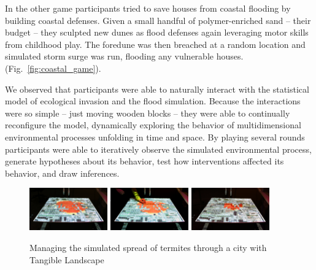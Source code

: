\documentclass[prodmode,acmtochi]{acmsmall} %
\begin{document}
In the other game participants tried to save houses 
from coastal flooding by building coastal defenses. 
Given a small handful of polymer-enriched sand 
-- their budget -- 
they sculpted new dunes as flood defenses
again leveraging motor skills from childhood play.
The foredune was then breached at a random location 
and simulated storm surge was run, flooding any vulnerable houses. 
(Fig.~\ref{fig:coastal_game}). 

We observed that participants were able to naturally 
interact with the statistical model of ecological invasion
and the flood simulation. 
Because the interactions were so simple %
-- just moving wooden blocks --
they were able to continually reconfigure the model,
dynamically exploring the behavior 
of multidimensional environmental processes
unfolding in time and space. 
By playing several rounds participants were able to 
iteratively observe the simulated environmental process, 
generate hypotheses about its behavior, 
test how interventions affected its behavior, 
and draw inferences. 



\begin{figure}[ht!]
\begin{center}
		\includegraphics[width=0.3\textwidth]{images/termite_game_1.jpg}
		\includegraphics[width=0.3\textwidth]{images/termite_game_2.jpg}
		\includegraphics[width=0.3\textwidth]{images/termite_game_3.jpg}
	\caption{Managing the simulated spread of termites through a city with Tangible Landscape}
	\label{fig:termite_game}
\end{center}
\end{figure}
\end{document}
